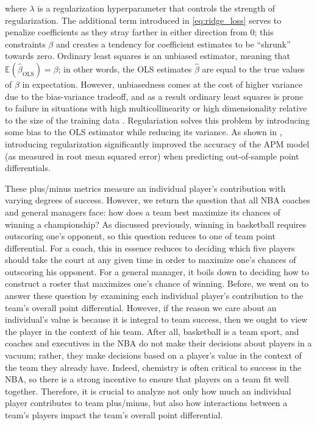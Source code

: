 where $\lambda$ is a regularization hyperparameter that controls the strength of
regularization. The additional term introduced in \eqref{eq:ridge_loss} serves to
penalize coefficients as they stray farther in either direction from 0; this
constraints $\beta$ and creates a tendency for coefficient estimates to be “shrunk”
towards zero. Ordinary least squares is an unbiased estimator, meaning that
$\mathbb{E} \left(\hat\beta_{\text{OLS}}\right) = \beta$; in other words, the OLS
estimates $\hat\beta$ are equal to the true values of $\beta$ in expectation.
However, unbiasedness comes at the cost of higher variance due to the bias-variance
tradeoff, and as a result ordinary least squares is prone to failure in situations
with high multicollinearity or high dimensionality relative to the size of the
training data \cite{Ridge,Bishop}. Regulariation solves this problem by introducing
some bias to the OLS estimator while reducing its variance. As shown in
\citet{Sill}, introducing regularization significantly improved the accuracy of the
APM model (as measured in root mean squared error) when predicting out-of-sample
point differentials.

These plus/minus metrics measure an individual player's contribution with varying
degrees of success. However, we return the question that all NBA coaches and general
managers face: how does a team best maximize its chances of winning a championship?
As discussed previously, winning in basketball requires outscoring one's opponent,
so this question reduces to one of team point differential. For a coach, this in
essence reduces to deciding which five players should take the court at any given
time in order to maximize one's chances of outscoring his opponent. For a general
manager, it boils down to deciding how to construct a roster that maximizes one's
chance of winning. Before, we went on to answer these question by examining each
individual player's contribution to the team's overall point differential. However,
if the reason we care about an individual's value is because it is integral to team
success, then we ought to view the player in the context of his team. After all,
basketball is a team sport, and coaches and executives in the NBA do not make their
decisions about players in a vacuum; rather, they make decisions based on a player’s
value in the context of the team they already have. Indeed, chemistry is often
critical to success in the NBA, so there is a strong incentive to ensure that
players on a team fit well together. Therefore, it is crucial to analyze not only
how much an individual player contributes to team plus/minus, but also how
interactions between a team's players impact the team's overall point differential.

